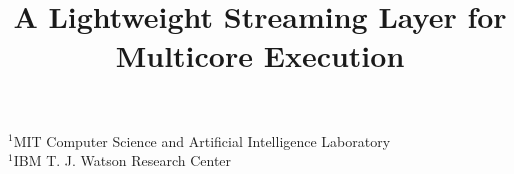 %
%
%
%
%
%
%
%
%
%
%
% 
% 
\title{A Lightweight Streaming Layer for Multicore Execution}

           {$^1$MIT Computer Science and Artificial Intelligence Laboratory\\
            $^1$IBM T. J. Watson Research Center}
           {}
\maketitle

